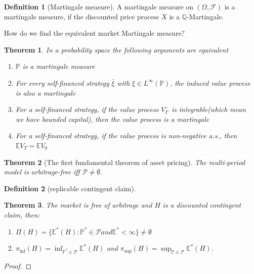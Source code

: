 \documentclass[a4paper,11pt]{book}
\newtheorem{theorem}{Theorem}[section]
\theoremstyle{definition}
\newtheorem{definition}{Definition}[section]
\theoremstyle{remark}
\begin{document}
\begin{definition}[Martingale measure]
	A martingale measure on $(\Omega, \mathcal{F})$ is a martingale measure, if the discounted price process $X$ is a $\mathbb{Q}$-Martingale.  
\end{definition}

How do we find the equivalent market Martingale measure?

\begin{theorem}
	In a probability space the following arguments are equivalent
	\begin{enumerate}
		\item $\mathbb{P}$ is a martingale measure
		\item For every self-financed strategy $\bar{\xi}$ with $\xi \in L^\infty(\mathbb{P})$, the induced value process is also a martingale
		\item For a self-financed strategy, if the value process $V^-_T$ is integrable(which mean we have bounded capital), then the value process is a martingale
		\item For a self-financed strategy, if the value process is non-negative a.s., then $\mathbb{E}V_T = \mathbb{E}V_0$
	\end{enumerate}
\end{theorem}

\begin{theorem}[The first fundamental theorem of asset pricing]
The multi-period model is arbitrage-free iff $\mathcal{P} \neq \emptyset$.
\end{theorem}
 
\begin{definition}[replicable contingent claim]
\end{definition}

\begin{theorem}
The market is free of arbitrage and $H$ is a discounted contingent claim, then:
\begin{enumerate}
	\item $\Pi(H) = \{ \mathbb{E}^*(H): \mathbb{P}^* \in \mathcal{P} and \mathbb{E}^* < \infty \} \neq \emptyset$
	\item $\pi_{\inf}(H) = \inf_{\mathbb{P}^* \in \mathcal{P}} \mathbb{E}^*(H)$ and $\pi_{\sup}(H) = \sup_{\mathbb{P} \in \mathcal{P}} \mathbb{E}^*(H)$.
\end{enumerate}
\end{theorem}
\begin{proof}
\end{proof}
\end{document}
